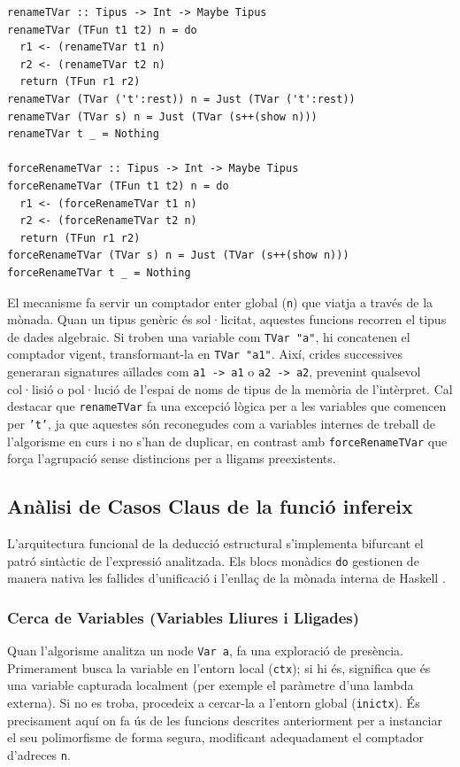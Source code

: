 \begin{lstlisting}[style=haskellstyle, caption=Mètodes per a l'instanciació de variables i reanomenament dinàmic]
renameTVar :: Tipus -> Int -> Maybe Tipus
renameTVar (TFun t1 t2) n = do 
  r1 <- (renameTVar t1 n)
  r2 <- (renameTVar t2 n)
  return (TFun r1 r2)
renameTVar (TVar ('t':rest)) n = Just (TVar ('t':rest))
renameTVar (TVar s) n = Just (TVar (s++(show n)))
renameTVar t _ = Nothing

forceRenameTVar :: Tipus -> Int -> Maybe Tipus
forceRenameTVar (TFun t1 t2) n = do 
  r1 <- (forceRenameTVar t1 n)
  r2 <- (forceRenameTVar t2 n)
  return (TFun r1 r2)
forceRenameTVar (TVar s) n = Just (TVar (s++(show n)))
forceRenameTVar t _ = Nothing
\end{lstlisting}

El mecanisme fa servir un comptador enter global (\texttt{n}) que viatja a través de la mònada. Quan un tipus genèric és sol·licitat, aquestes funcions recorren el tipus de dades algebraic. Si troben una variable com \texttt{TVar "a"}, hi concatenen el comptador vigent, transformant-la en \texttt{TVar "a1"}. Així, crides successives generaran signatures aïllades com \texttt{a1 -> a1} o \texttt{a2 -> a2}, prevenint qualsevol col·lisió o pol·lució de l'espai de noms de tipus de la memòria de l'intèrpret. Cal destacar que \texttt{renameTVar} fa una excepció lògica per a les variables que comencen per \texttt{'t'}, ja que aquestes són reconegudes com a variables internes de treball de l'algorisme en curs i no s'han de duplicar, en contrast amb \texttt{forceRenameTVar} que força l'agrupació sense distincions per a lligams preexistents.

\subsection{Anàlisi de Casos Claus de la funció infereix}

L'arquitectura funcional de la deducció estructural s'implementa bifurcant el patró sintàctic de l'expressió analitzada. Els blocs monàdics \texttt{do} gestionen de manera nativa les fallides d'unificació i l'enllaç de la mònada interna de Haskell \cite{wadler1992essence}.

\subsubsection{Cerca de Variables (Variables Lliures i Lligades)}

Quan l'algorisme analitza un node \texttt{Var a}, fa una exploració de presència. Primerament busca la variable en l'entorn local (\texttt{ctx}); si hi és, significa que és una variable capturada localment (per exemple el paràmetre d'una lambda externa). Si no es troba, procedeix a cercar-la a l'entorn global (\texttt{inictx}). És precisament aquí on fa ús de les funcions descrites anteriorment per a instanciar el seu polimorfisme de forma segura, modificant adequadament el comptador d'adreces \texttt{n}.

